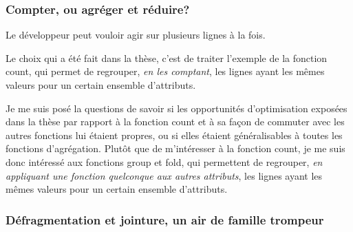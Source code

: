 \subsubsection*{Compter, ou agréger et réduire?}
Le développeur peut vouloir agir sur plusieurs lignes à la fois.

Le choix qui a été fait dans la thèse, c'est de traiter l'exemple
de la fonction count, qui permet de regrouper, \emph{en les comptant},
les lignes ayant les mêmes valeurs pour un certain ensemble d'attributs.

Je me suis posé la questions de savoir si les opportunités d'optimisation
exposées dans la thèse par rapport à la fonction count et à sa façon de commuter
avec les autres fonctions lui étaient propres, ou si elles étaient généralisables
à toutes les fonctions d'agrégation. Plutôt que de m'intéresser à la fonction
count, je me suis donc intéressé aux fonctions group et fold, qui permettent
de regrouper, \emph{en appliquant une fonction quelconque aux autres attributs},
les lignes ayant les mêmes valeurs pour un certain ensemble d'attributs.

\subsubsection*{Défragmentation et jointure, un air de famille trompeur}